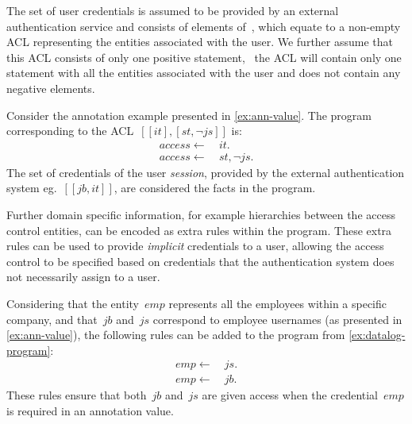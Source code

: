 The set of user credentials is assumed to be provided by an external authentication service and consists of elements
of~\ACT, which equate to a non-empty \ac{ACL} representing the entities associated with the user.  We further assume
that this \ac{ACL} consists of only one positive statement, \ie~the \ac{ACL} will contain only one statement with all
the entities associated with the user and does not contain any negative elements.
%
\vspace{-10pt}
%
\begin{example}
  \label{ex:datalog-program}
  Consider the annotation example presented in \cref{ex:ann-value}. The \nrdn program corresponding to the
  \ac{ACL}~$[[it],[st, \neg js]]$ is:
  \begin{align*}
    access \leftarrow &~it .\\
    access \leftarrow &~st, \neg js .  
  \end{align*}
  The set of credentials of the user \emph{session}, provided by the external authentication system eg.~$[[jb,it]]$, are
  considered the facts in the \nrdn program.
\end{example}
%
Further domain specific information, for example hierarchies between the access control entities, can be encoded as
extra rules within the \nrdn program.  These extra rules can be used to provide \emph{implicit} credentials to a user,
allowing the access control to be specified based on credentials that the authentication system does not necessarily
assign to a user.
%
\begin{example}
  Considering that the entity~$emp$ represents all the employees within a specific company, and that~$jb$ and~$js$
  correspond to employee usernames (as presented in \cref{ex:ann-value}), the following rules can be added to the
  \nrdn program from \cref{ex:datalog-program}:
  \begin{align*}
    emp \leftarrow &~ js .\\
    emp \leftarrow &~ jb .  
  \end{align*}
  These rules ensure that both~$jb$ and~$js$ are given access when the credential~$emp$ is required in an annotation
  value.
\end{example}


